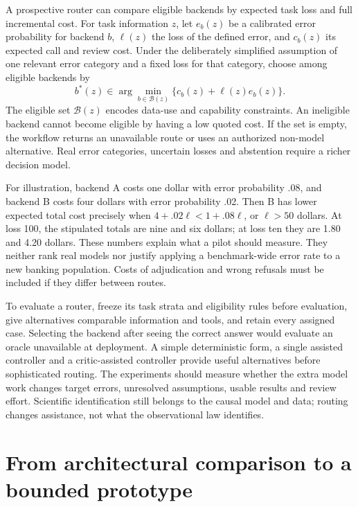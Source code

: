 A prospective router can compare eligible backends by expected task loss
and full incremental cost. For task information $z$, let $e_b(z)$ be a
calibrated error probability for backend $b$, $\ell(z)$ the loss of the
defined error, and $c_b(z)$ its expected call and review cost. Under the
deliberately simplified assumption of one relevant error category and a
fixed loss for that category, choose among eligible backends by
\begin{equation}
 b^*(z)\in\arg\min_{b\in\mathcal B(z)}
       \{c_b(z)+\ell(z)e_b(z)\}.
 \label{exec14:l6-route}
\end{equation}
The eligible set $\mathcal B(z)$ encodes data-use and capability constraints.
An ineligible backend cannot become eligible by having a low quoted cost.
If the set is empty, the workflow returns an unavailable route or uses an
authorized non-model alternative. Real error categories, uncertain losses
and abstention require a richer decision model. \citep{exec14_l6_exact}

For illustration, backend A costs one dollar with error probability .08,
and backend B costs four dollars with error probability .02. Then B has
lower expected total cost precisely when
$4+.02\ell<1+.08\ell$, or $\ell>50$ dollars. At loss 100, the stipulated
totals are nine and six dollars; at loss ten they are 1.80 and 4.20 dollars.
These numbers explain what a pilot should measure. They neither rank real
models nor justify applying a benchmark-wide error rate to a new banking
population. Costs of adjudication and wrong refusals must be included if
they differ between routes. \citep{exec14_l6_exact}

To evaluate a router, freeze its task strata and eligibility rules before
evaluation, give alternatives comparable information and tools, and retain
every assigned case. Selecting the backend after seeing the correct answer
would evaluate an oracle unavailable at deployment. A simple deterministic
form, a single assisted controller and a critic-assisted controller provide
useful alternatives before sophisticated routing. The experiments should
measure whether the extra model work changes target errors, unresolved
assumptions, usable results and review effort. Scientific identification
still belongs to the causal model and data; routing changes assistance,
not what the observational law identifies.

\section{From architectural comparison to a bounded prototype}

